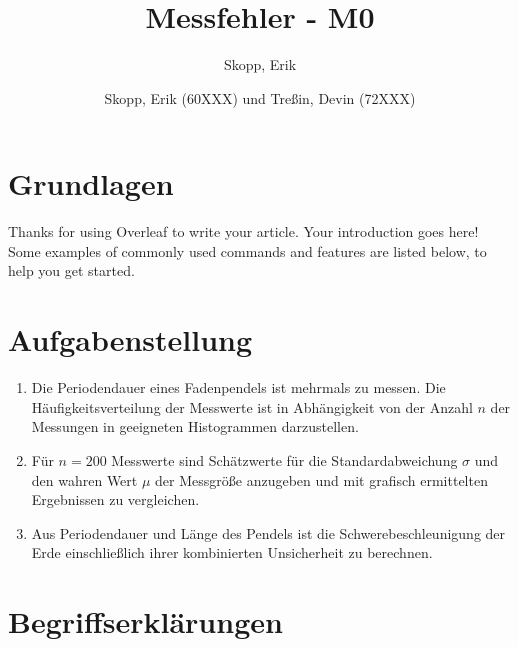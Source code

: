 \documentclass[fleqn,10pt]{olplainarticle}
\title{Messfehler - M0}
\author[1]{Skopp, Erik}
\author[2]{Skopp, Erik (60XXX) und Treßin, Devin (72XXX)}
\begin{document}
\flushbottom
\maketitle
\thispagestyle{empty}

\section*{Grundlagen}

Thanks for using Overleaf to write your article. Your introduction goes here! Some examples of commonly used commands and features are listed below, to help you get started.

\section{Aufgabenstellung}
\begin{enumerate}
    \item Die Periodendauer eines Fadenpendels ist mehrmals zu messen. Die Häufigkeitsverteilung der Messwerte ist in Abhängigkeit von der Anzahl $n$ der Messungen in geeigneten Histogrammen darzustellen. 

    \item Für $n = 200 $ Messwerte sind Schätzwerte für die Standardabweichung $ \sigma $  und den wahren Wert $\mu $ der Messgröße anzugeben und mit grafisch ermittelten Ergebnissen zu vergleichen. 

    \item  Aus Periodendauer und Länge des Pendels ist die Schwerebeschleunigung der Erde einschließlich ihrer kombinierten Unsicherheit zu berechnen. 
\end{enumerate}


\section{Begriffserklärungen}
\end{document}
